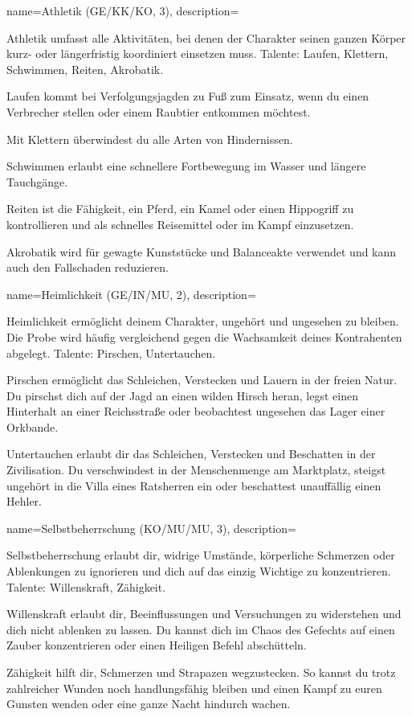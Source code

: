 {
    name={Athletik (GE/KK/KO, 3)},
    description={Athletik umfasst alle Aktivitäten, bei denen der Charakter seinen ganzen Körper kurz- oder längerfristig koordiniert einsetzen muss. Talente: Laufen, Klettern, Schwimmen, Reiten, Akrobatik.
    \begin{description}
\item Laufen kommt bei Verfolgungsjagden zu Fuß zum Einsatz, wenn du einen Verbrecher stellen oder einem Raubtier entkommen möchtest.
\item Mit Klettern überwindest du alle Arten von Hindernissen.
\item Schwimmen erlaubt eine schnellere Fortbewegung im Wasser und längere Tauchgänge.
\item Reiten ist die Fähigkeit, ein Pferd, ein Kamel oder einen Hippogriff zu kontrollieren und als schnelles Reisemittel oder im Kampf einzusetzen.
\item Akrobatik wird für gewagte Kunststücke und Balanceakte verwendet und kann auch den Fallschaden reduzieren.
\end{description}}}

{
    name={Heimlichkeit (GE/IN/MU, 2)},
    description={Heimlichkeit ermöglicht deinem Charakter, ungehört und ungesehen zu bleiben. Die Probe wird häufig vergleichend gegen die Wachsamkeit deines Kontrahenten abgelegt. Talente: Pirschen, Untertauchen.
\begin{description}
\item Pirschen ermöglicht das Schleichen, Verstecken und Lauern in der freien Natur. Du pirschst dich auf der Jagd an einen wilden Hirsch heran, legst einen Hinterhalt an einer Reichsstraße oder beobachtest ungesehen das Lager einer Orkbande.
\item Untertauchen erlaubt dir das Schleichen, Verstecken und Beschatten in der Zivilisation. Du verschwindest in der Menschenmenge am Marktplatz, steigst ungehört in die Villa eines Ratsherren ein oder beschattest unauffällig einen Hehler.
\end{description}}}

{
    name={Selbstbeherrschung (KO/MU/MU, 3)},
    description={Selbstbeherrschung erlaubt dir, widrige Umstände, körperliche Schmerzen oder Ablenkungen zu ignorieren und dich auf das einzig Wichtige zu konzentrieren. Talente: Willenskraft, Zähigkeit.
\begin{description}
\item Willenskraft erlaubt dir, Beeinflussungen und Versuchungen zu widerstehen und dich nicht ablenken zu lassen. Du kannst dich im Chaos des Gefechts auf einen Zauber konzentrieren oder einen Heiligen Befehl abschütteln. 
\item Zähigkeit hilft dir, Schmerzen und Strapazen wegzustecken. So kannst du trotz zahlreicher Wunden noch handlungsfähig bleiben und einen Kampf zu euren Gunsten wenden oder eine ganze Nacht hindurch wachen.
\end{description}}}

